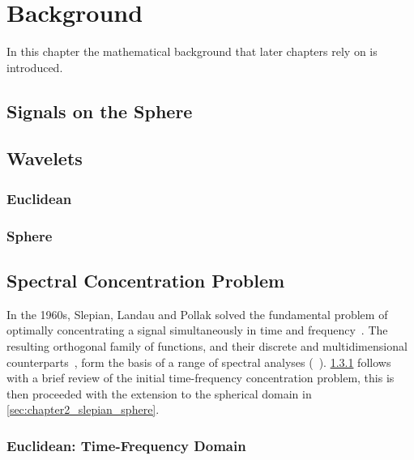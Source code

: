 \chapter{Background}\label{sec:chapter2}

In this chapter the mathematical background that later chapters rely on is introduced.

\section{Signals on the Sphere}



\section{Wavelets}

\subsection{Euclidean}

\subsection{Sphere}



\section{Spectral Concentration Problem}

In the 1960s, Slepian, Landau and Pollak solved the fundamental problem of optimally concentrating a signal simultaneously in time and frequency~\cite{Landau1961,Landau1962,Slepian1983,Slepian1961}.
The resulting orthogonal family of functions, and their discrete and multidimensional counterparts~\cite{Bronez1988,Hanssen1997,Liu1992,Slepian1964,Slepian1978}, form the basis of a range of spectral analyses (\eg{}~\cite{Thomson1982,Thomson1990}).
\cref{sec:chapter2_slepian_euclidean} follows with a brief review of the initial time-frequency concentration problem, this is then proceeded with the extension to the spherical domain in \cref{sec:chapter2_slepian_sphere}.

\subsection{Euclidean: Time-Frequency Domain}\label{sec:chapter2_slepian_euclidean}

